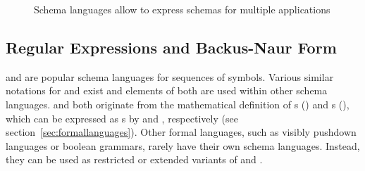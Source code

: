 \begin{figure}[h]
\centering
{}
\caption{Schema languages allow to express schemas for multiple applications}
\label{fig:schemavalidator}
\end{figure}

\subsection{Regular Expressions and Backus-Naur Form}
\label{sec:bnf}

 and  are popular
schema languages for sequences of symbols. Various similar notations for
 and  exist \cite{Goyvaerts2011} and elements of both are
used within other schema languages.  and  both originate
from the mathematical definition of s () and
s (), which can be expressed as
s by  and , respectively (see
section~\ref{sec:formallanguages}).  Other formal languages, such as visibly
pushdown languages or boolean grammars, rarely have their own schema languages.
Instead, they can be used as restricted or extended variants of  and
.

